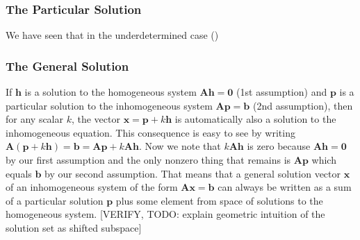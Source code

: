 
\subsubsection{The Particular Solution}
We have seen that in the underdetermined case ()


\subsubsection{The General Solution}
If $\mathbf{h}$ is a solution to the homogeneous system $\mathbf{A h = 0}$ (1st assumption) and $\mathbf{p}$ is a particular solution to the inhomogeneous system $\mathbf{A p = b}$ (2nd assumption), then for any scalar $k$, the vector $\mathbf{x} = \mathbf{p} + k \mathbf{h}$ is automatically also a solution to the inhomogeneous equation. This consequence is easy to see by writing $\mathbf{A} (\mathbf{p} + k \mathbf{h}) = \mathbf{b} = \mathbf{A p} + k \mathbf{A h}$. Now we note that $k \mathbf{A h}$ is zero because $\mathbf{A h = 0}$ by our first assumption and the only nonzero thing that remains is $\mathbf{A p}$ which equals $\mathbf{b}$ by our second assumption. That means that a general solution vector $\mathbf{x}$ of an inhomogeneous system of the form $\mathbf{A x = b}$ can always be written as a sum of a particular solution $\mathbf{p}$ plus some element from space of solutions to the homogeneous system. [VERIFY, TODO: explain geometric intuition of the solution set as shifted subspace]






